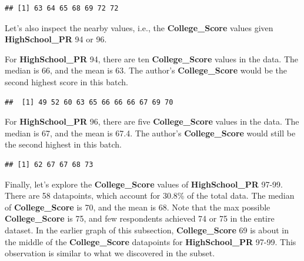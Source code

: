 \documentclass[
]{article}
\newenvironment{Shaded}{\begin{snugshade}}{\end{snugshade}}
\newcommand{\DecValTok}[1]{\textcolor[rgb]{0.00,0.00,0.81}{#1}}
\newcommand{\FunctionTok}[1]{\textcolor[rgb]{0.00,0.00,0.00}{#1}}
\newcommand{\NormalTok}[1]{#1}
\newcommand{\SpecialCharTok}[1]{\textcolor[rgb]{0.00,0.00,0.00}{#1}}
\begin{document}
\begin{verbatim}
## [1] 63 64 65 68 69 72 72
\end{verbatim}

Let's also inspect the nearby values, i.e., the \textbf{College\_Score}
values given \textbf{HighSchool\_PR} 94 or 96.

For \textbf{HighSchool\_PR} 94, there are ten \textbf{College\_Score}
values in the data. The median is 66, and the mean is 63. The author's
\textbf{College\_Score} would be the second highest score in this batch.

\begin{Shaded}
\end{Shaded}

\begin{verbatim}
##  [1] 49 52 60 63 65 66 66 66 67 69 70
\end{verbatim}

For \textbf{HighSchool\_PR} 96, there are five \textbf{College\_Score}
values in the data. The median is 67, and the mean is 67.4. The author's
\textbf{College\_Score} would still be the second highest in this batch.

\begin{Shaded}
\end{Shaded}

\begin{verbatim}
## [1] 62 67 67 68 73
\end{verbatim}

Finally, let's explore the \textbf{College\_Score} values of
\textbf{HighSchool\_PR} 97-99. There are 58 datapoints, which account
for 30.8\% of the total data. The median of \textbf{College\_Score} is
70, and the mean is 68. Note that the max possible
\textbf{College\_Score} is 75, and few respondents achieved 74 or 75 in
the entire dataset. In the earlier graph of this subsection,
\textbf{College\_Score} 69 is about in the middle of the
\textbf{College\_Score} datapoints for \textbf{HighSchool\_PR} 97-99.
This observation is similar to what we discovered in the subset.
\end{document}
